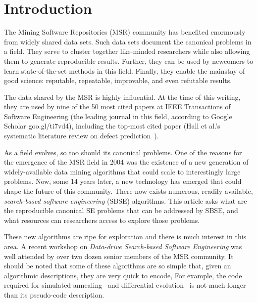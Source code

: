 \documentclass[table, xcdraw, sigconf,review, anonymous]{acmart}
\begin{document}


\keywords{}


\maketitle
\pagestyle{plain}
% 
\section{Introduction}
The Mining Software Repositories (MSR) community has benefited enormously from widely shared data sets.  Such data sets document the canonical problems in a field.
They serve to cluster together like-minded researchers while also
  allowing   them to generate reproducible results. Further, they can be used by
   newcomers to learn state-of-the-set methods in this field. Finally, they enable the mainstay of good science:
reputable, repeatable,  improvable, and even refutable results.

The data shared by the MSR is highly influential.
At the time of this writing, they are used by nine of the 50 most cited papers at IEEE Transactions of Software Engineering (the leading journal in this field, according to Google Scholar  goo.gl/ti7vd4),
including the top-most cited paper (Hall et al.'s systematic literature review on defect prediction~\cite{hall12tse}).

As a field evolves, so too should its canonical problems. One of the reasons for the emergence of the MSR field in 2004 was the existence of a new generation of widely-available data mining
algorithms that could scale to interestingly large problems.  Now, some 14 years later, a new technology has emerged that could shape the future of this community. There now exists numerous, readily
available, {\em search-based software engineering} (SBSE) algorithms. This article asks what are the reproducible
canonical SE problems that can be addressed by SBSE, and what resources can researchers access to explore those problems.

These new algorithms are ripe for exploration and there is much interest in this area.
A recent workshop  on {\em Data-drive Search-based Software
Engineering } was well attended by over two dozen senior members of the MSR community.
It should be noted that some of these algorithms are so simple that, 
given an algorithmic descriptions, they are very quick to encode,
For example, the code required for simulated annealing~\cite{van1987simulated} and
differential evolution~\cite{storn97} is not much longer than its pseudo-code description. 
\end{document}
